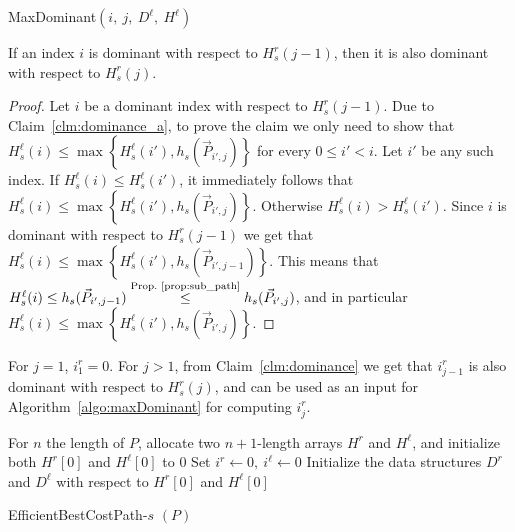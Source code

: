 \begin{algorithm}
	\;
	\caption{MaxDominant$(i, \ j, \ D^\ell, \ H^\ell)$}
	\label{algo:maxDominant}
\end{algorithm}


\begin{claim}
	\label{clm:dominance}
	If an index $i$ is dominant with respect to $H^r_s(j-1)$, then it is also dominant with respect to  $H^r_s(j)$.
\end{claim}

\begin{proof}
	Let $i$ be a dominant index with respect to $H^r_s(j-1)$. Due to Claim~\ref{clm:dominance_a}, to prove the claim we only need to show that $H^\ell_s(i) \leq \max\left\{H^\ell_s(i'), h_s(\vec{P}_{i', j})\right\}$ for every $0 \leq i' < i$.
	Let $i'$ be any such index.
	If $H^\ell_s(i) \leq H^\ell_s(i')$, it immediately follows that $H^\ell_s(i) \leq \max\left\{H^\ell_s(i'), h_s(\vec{P}_{i', j})\right\}$.
	Otherwise  $H^\ell_s(i) > H^\ell_s(i')$. Since $i$ is dominant with respect to $H^r_s(j-1)$ we get that $H^\ell_s(i) \leq \max\left\{H^\ell_s(i'), h_s(\vec{P}_{i', j-1})\right\}$. This means that $H^\ell_s(i) \leq h_s(\vec{P}_{i', j-1}) \stackrel{\text{Prop.~\ref{prop:sub_path}}}{\leq} h_s(\vec{P}_{i', j})$, and in particular $H^\ell_s(i) \leq \max\left\{H^\ell_s(i'), h_s(\vec{P}_{i', j})\right\}$.
\end{proof}

For $j = 1$, $i^r_1 = 0$. For $j > 1$, from Claim~\ref{clm:dominance} we get that $i^r_{j-1}$ is also dominant with respect to $H^r_s(j)$, and can be used as an input for Algorithm~\ref{algo:maxDominant} for computing $i^r_j$.



\begin{algorithm}
	For $n$ the length of $P$, allocate two $n+1$-length arrays $H^r$ and $H^\ell$, and initialize both $H^r[0]$ and $H^{\ell}[0]$ to $0$\;
	Set $i^r \gets 0, \ i^\ell \gets 0$\;
	Initialize the data structures $D^r$ and $D^\ell$ with respect to $H^r[0]$ and $H^{\ell}[0]$\;
	\;
	\caption{EfficientBestCostPath-$s$ $(P)$}
	\label{algo:effH}
\end{algorithm}

